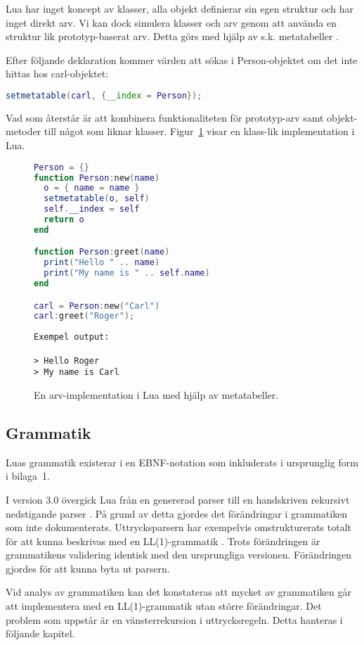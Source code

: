 Lua har inget koncept av klasser, alla objekt definierar sin egen struktur och
har inget direkt arv. Vi kan dock simulera klasser och arv genom att använda
en struktur lik prototyp-baserat arv. Detta görs med hjälp av s.k.
metatabeller \citep[s. 151]{ir06}.

Efter följande deklaration kommer värden att sökas i Person-objektet om det
inte hittas hos carl-objektet:
\\

\begin{lstlisting}[language=Lua]
setmetatable(carl, {__index = Person});
\end{lstlisting}
\vspace{-2em}
Vad som återstår är att kombinera funktionaliteten för prototyp-arv samt
objekt-metoder till något som liknar klasser. Figur~\ref{fig:class} visar en
klass-lik implementation i Lua.

\begin{figure}[ht]
  \begin{minipage}[t]{0.5\textwidth}
\begin{lstlisting}[language=Lua]
Person = {}
function Person:new(name)
  o = { name = name }
  setmetatable(o, self)
  self.__index = self
  return o
end

function Person:greet(name)
  print("Hello " .. name)
  print("My name is " .. self.name)
end

carl = Person:new("Carl")
carl:greet("Roger");
\end{lstlisting}
  \end{minipage}
  \begin{minipage}[t]{0.5\textwidth}
\begin{lstlisting}[]
Exempel output:

> Hello Roger
> My name is Carl
\end{lstlisting}
  \end{minipage}
  \caption{En arv-implementation i Lua med hjälp av metatabeller.}
  \label{fig:class}
\end{figure}

\subsection{Grammatik}

Luas grammatik existerar i en EBNF-notation som inkluderats i
ursprunglig form i bilaga~1.

I version 3.0 övergick Lua från en genererad parser till en handskriven
rekursivt nedstigande parser \citep{luaimp}. På grund av detta gjordes det
förändringar i grammatiken som inte dokumenterats. Uttrycksparsern har
exempelvis omstrukturerats totalt för att kunna beskrivas med en
LL(1)-grammatik \citep[s. 175]{bf09}. Trots förändringen är grammatikens
validering identisk med den ursprungliga versionen. Förändringen gjordes för
att kunna byta ut parsern.

Vid analys av grammatiken kan det konstateras att mycket av grammatiken går att
implementera med en LL(1)-grammatik utan större förändringar. Det problem som
uppstår är en vänsterrekursion i uttrycksregeln. Detta hanteras i följande
kapitel.

